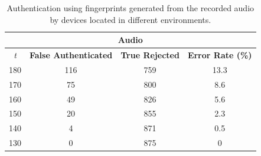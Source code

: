\begin{table}[H]
\label{tab_rejectionAudio}
\begin{center}
\begin{tabular}{|c|c c c|}
\hline
\multicolumn{4}{|c|}{\textbf{Audio}} \\\hline
\textit{t} &\textbf{False Authenticated}& \textbf{True Rejected}& \textbf{Error Rate (\%)}  \\ \cline{1-4}
180 & 116 & 759 & 13.3\\ \cline{2-4}
170 & 75 & 800 & 8.6\\ \cline{2-4}
160 & 49 & 826 & 5.6\\ \cline{2-4}
150 & 20 & 855 & 2.3\\ \cline{2-4}
140 & 4 & 871 & 0.5\\ \cline{2-4}
130 & 0 & 875 & 0\\ \cline{1-4}
\end{tabular}
\caption{Authentication using fingerprints generated from the recorded audio by devices located in different environments. }
\end{center}
\end{table}

